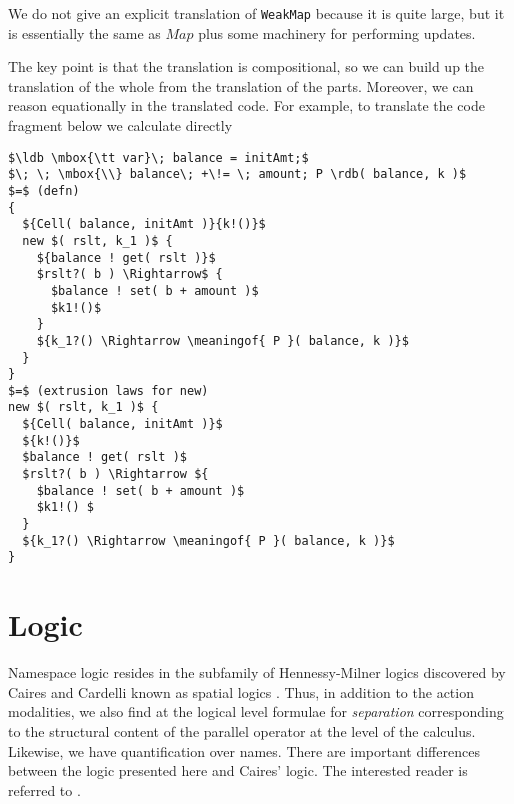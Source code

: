 \documentclass[]{acm_proc_article-sp}
\newcommand{\ldb}{[\![}
\newcommand{\rdb}{]\!]}
\newcommand{\meaningof}[1]{\ldb #1 \rdb}
\numberwithin{equation}{subsection}
\begin{document}
We do not give an explicit translation of {\tt WeakMap} because it is quite
large, but it is essentially the same as $Map$ plus some machinery for performing
updates.



The key point is that the translation is compositional, so we can
build up the translation of the whole from the translation of the
parts. Moreover, we can reason equationally in the translated
code. For example, to translate the code fragment below we calculate
directly


\begin{lstlisting}[mathescape]
$\ldb \mbox{\tt var}\; balance = initAmt;$
$\; \; \mbox{\\} balance\; +\!= \; amount; P \rdb( balance, k )$
$=$ (defn)
{ 
  ${Cell( balance, initAmt )}{k!()}$
  new $( rslt, k_1 )$ { 
    ${balance ! get( rslt )}$
    $rslt?( b ) \Rightarrow$ {
      $balance ! set( b + amount )$
      $k1!()$
    }
    ${k_1?() \Rightarrow \meaningof{ P }( balance, k )}$
  }
}
$=$ (extrusion laws for new)
new $( rslt, k_1 )$ {
  ${Cell( balance, initAmt )}$
  ${k!()}$
  $balance ! get( rslt )$
  $rslt?( b ) \Rightarrow ${
    $balance ! set( b + amount )$
    $k1!() $
  }
  ${k_1?() \Rightarrow \meaningof{ P }( balance, k )}$
}
\end{lstlisting}

\section{Logic}
Namespace logic resides in the subfamily of Hennessy-Milner logics
discovered by Caires and Cardelli known as spatial logics
\cite{DBLP:conf/fossacs/Caires04}. Thus, in addition to the action
modalities, we also find at the logical level formulae for
\emph{separation} corresponding to the structural content of the
parallel operator at the level of the calculus. Likewise, we have
quantification over names. There are important differences between the
logic presented here and Caires' logic. The interested reader is
referred to \cite{DBLP:conf/tgc/MeredithR05}.
\end{document}
